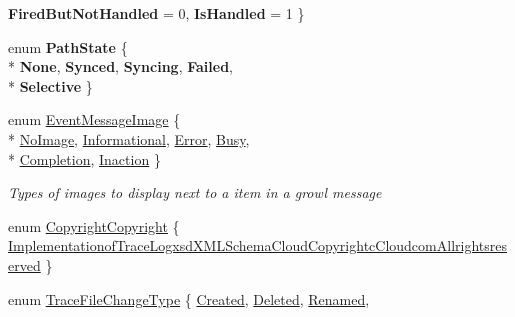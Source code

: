 \begin{DoxyCompactItemize}
{\bfseries Fired\-But\-Not\-Handled} = 0, 
{\bfseries Is\-Handled} = 1
 \}
\item 
enum {\bfseries Path\-State} \{ \\*
{\bfseries None}, 
{\bfseries Synced}, 
{\bfseries Syncing}, 
{\bfseries Failed}, 
\\*
{\bfseries Selective}
 \}
\item 
enum \hyperlink{namespace_cloud_api_public_1_1_static_aefcc1e7e1c81366ec3f6affd41c1f817}{Event\-Message\-Image} \{ \\*
\hyperlink{namespace_cloud_api_public_1_1_static_aefcc1e7e1c81366ec3f6affd41c1f817af27bab21bdf9c452d2f86b903879895c}{No\-Image}, 
\hyperlink{namespace_cloud_api_public_1_1_static_aefcc1e7e1c81366ec3f6affd41c1f817a5391f9a882a54c787b206138ed6d28b0}{Informational}, 
\hyperlink{namespace_cloud_api_public_1_1_static_aefcc1e7e1c81366ec3f6affd41c1f817a902b0d55fddef6f8d651fe1035b7d4bd}{Error}, 
\hyperlink{namespace_cloud_api_public_1_1_static_aefcc1e7e1c81366ec3f6affd41c1f817ad8a942ef2b04672adfafef0ad817a407}{Busy}, 
\\*
\hyperlink{namespace_cloud_api_public_1_1_static_aefcc1e7e1c81366ec3f6affd41c1f817a2fea59b7e470acac5ec1589d504da14e}{Completion}, 
\hyperlink{namespace_cloud_api_public_1_1_static_aefcc1e7e1c81366ec3f6affd41c1f817a630f75b7ac83cf393b3562162d599cbf}{Inaction}
 \}
\begin{DoxyCompactList}\small\item\em Types of images to display next to a item in a growl message \end{DoxyCompactList}\item 
enum \hyperlink{namespace_cloud_api_public_1_1_static_a889ed6895b377efd7091a65ddb8cb3f0}{Copyright\-Copyright} \{ \hyperlink{namespace_cloud_api_public_1_1_static_a889ed6895b377efd7091a65ddb8cb3f0a299712aa65c961cccd5a657aa281fa62}{Implementationof\-Trace\-Logxsd\-X\-M\-L\-Schema\-Cloud\-Copyrightc\-Cloudcom\-Allrightsreserved}
 \}
\begin{DoxyCompactList}\small\item\em \end{DoxyCompactList}\item 
enum \hyperlink{namespace_cloud_api_public_1_1_static_aadccab0d764f187bdd87a34e98676034}{Trace\-File\-Change\-Type} \{ \hyperlink{namespace_cloud_api_public_1_1_static_aadccab0d764f187bdd87a34e98676034a0eceeb45861f9585dd7a97a3e36f85c6}{Created}, 
\hyperlink{namespace_cloud_api_public_1_1_static_aadccab0d764f187bdd87a34e98676034a5fe6005bf6e415c950c011fb65f12b8f}{Deleted}, 
\hyperlink{namespace_cloud_api_public_1_1_static_aadccab0d764f187bdd87a34e98676034ab28f2757ce8f7bb1a72486d7a3500a4e}{Renamed}, 

\end{DoxyCompactItemize}
